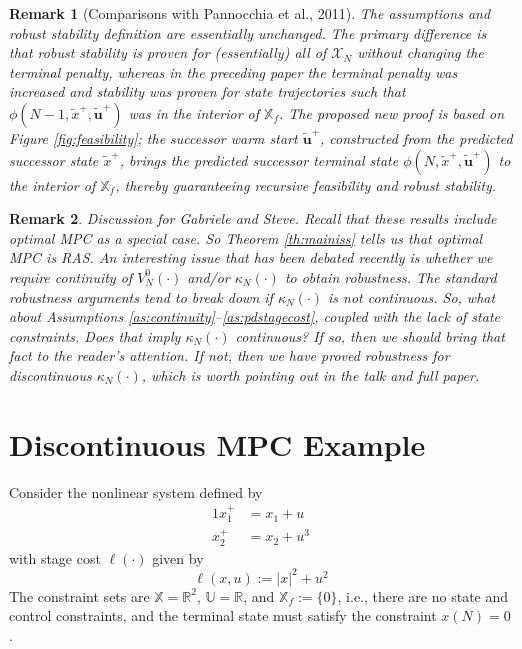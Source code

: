 \documentclass{article}
\newtheorem{remark}{Remark}
\newcommand{\bbR}{\mathbb{R}}
\newcommand{\bbX}{\mathbb{X}}
\newcommand{\eqbyd}{:=}
\newcommand{\bbU}{\mathbb{U}}
\begin{document}
\begin{remark}[Comparisons with Pannocchia et al., 2011]
The assumptions and robust stability definition are essentially unchanged. 
The primary difference is that robust stability is proven for (essentially)
all of $\mathcal{X}_N$ without changing the terminal penalty, whereas in the preceding paper the terminal penalty was increased and stability 
was proven for state trajectories such that $\phi(N-1,\tilde{x}^+,\tilde{\mathbf{u}}^+)$ was in the interior of $\mathbb{X}_f$. 
The proposed new proof is based on Figure \ref{fig:feasibility};
the successor warm start $\tilde{\mathbf{u}}^+$, constructed from the predicted successor state $\tilde{x}^+$, brings the predicted successor 
terminal state $\phi(N,\tilde{x}^+,\tilde{\mathbf{u}}^+)$ to the interior of $\mathbb{X}_f$, thereby guaranteeing recursive feasibility and
robust stability.
\end{remark}

\begin{remark}
Discussion for Gabriele and Steve. Recall that these results include
\textit{optimal} MPC as a special case.  So Theorem \ref{th:mainiss}
tells us that optimal MPC is RAS. An interesting issue that has been debated
recently is whether we require \textit{continuity} of $V_N^0(\cdot)$
and/or $\kappa_N(\cdot)$ to obtain robustness.  The standard
robustness arguments tend to break down if $\kappa_N(\cdot)$ is not
continuous. So, what about Assumptions
\ref{as:continuity}--\ref{as:pdstagecost}, coupled with the lack of 
state constraints. Does that imply $\kappa_N(\cdot)$ continuous? 
If so, then we should bring that fact to the reader's attention.
If not, then we have proved robustness for discontinuous
$\kappa_N(\cdot)$, which is worth pointing out in the talk and full
paper.
\end{remark}


\section{Discontinuous MPC Example}

Consider the nonlinear system defined  by
\begin{alignat*}{1}
    x_1^+ &= x_1+u\\
    x_2^+ &= x_2+u^3
\end{alignat*}
with stage cost $\ell(\cdot)$ given by 
\begin{equation*}
  \ell(x,u) \eqbyd |x|^2 + u^2
\end{equation*}
The constraint sets are $\bbX=\bbR^2$, $\bbU=\bbR$,
and $\bbX_f\eqbyd\{0\}$, i.e., there are no state and control
constraints, and the terminal state must satisfy the constraint
$x(N)=0$. 
\end{document}

